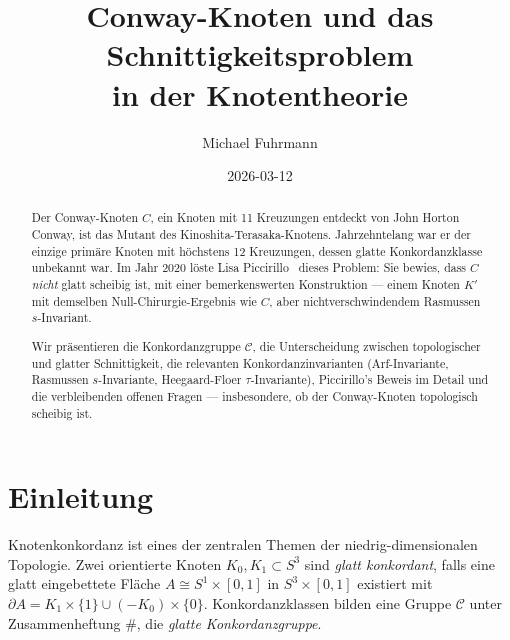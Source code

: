 \documentclass[12pt,a4paper]{amsart}
\theoremstyle{definition}
\theoremstyle{remark}
\begin{document}
\begin{abstract}
Der Conway-Knoten $C$, ein Knoten mit 11 Kreuzungen entdeckt von John Horton
Conway, ist das Mutant des Kinoshita-Terasaka-Knotens. Jahrzehntelang war
er der einzige primäre Knoten mit höchstens 12 Kreuzungen, dessen glatte
Konkordanzklasse unbekannt war. Im Jahr 2020 löste Lisa Piccirillo~\cite{Piccirillo2020}
dieses Problem: Sie bewies, dass $C$ \emph{nicht} glatt scheibig ist,
mit einer bemerkenswerten Konstruktion — einem Knoten $K'$ mit demselben
Null-Chirurgie-Ergebnis wie $C$, aber nichtverschwinden\-dem Rasmussen
$s$-Invariant.

Wir präsentieren die Konkordanzgruppe $\mathcal{C}$, die Unterscheidung
zwischen topologischer und glatter Schnittigkeit, die relevanten
Konkordanzinvarianten (Arf-Invariante, Rasmussen $s$-Invariante,
Heegaard-Floer $\tau$-Invariante), Piccirillo's Beweis im Detail und
die verbleibenden offenen Fragen — insbesondere, ob der Conway-Knoten
topologisch scheibig ist.
\end{abstract}

\title{Conway-Knoten und das Schnittigkeitsproblem\\
in der Knotentheorie}
\author{Michael Fuhrmann}
\address{Specialist Mathematics Project, Build 165}
\date{2026-03-12}

\maketitle

\section{Einleitung}

Knotenkonkordanz ist eines der zentralen Themen der niedrig-dimensionalen
Topologie. Zwei orientierte Knoten $K_0, K_1 \subset S^3$ sind
\emph{glatt konkordant}, falls eine glatt eingebettete Fläche
$A \cong S^1 \times [0,1]$ in $S^3 \times [0,1]$ existiert mit
$\partial A = K_1 \times \{1\} \cup (-K_0) \times \{0\}$. Konkordanzklassen
bilden eine Gruppe $\mathcal{C}$ unter Zusammenheftung $\#$, die
\emph{glatte Konkordanzgruppe}.
\end{document}
